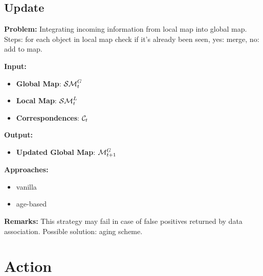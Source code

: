 \documentclass{article}
\begin{document}
		
	
	\subsection{Update} 
	
	{\bf Problem: } Integrating incoming information from local map into global map. Steps: for each object in local map check if it's already been seen, yes: merge, no: add to map. 
	
	\noindent
	{\bf Input: }
	\begin{itemize}
		\item {\bf Global Map}: $\mathcal{SM}_t^G$
		\item {\bf Local Map}: $\mathcal{SM}_t^L$
		\item {\bf Correspondences}: $\mathcal{C}_t$		
	\end{itemize}
	\noindent
	{\bf Output: }
	\begin{itemize}
		\item {\bf Updated Global Map}: $\mathcal{M}_{t+1}^G$
	\end{itemize}
	\noindent
	{\bf Approaches: }
	\begin{itemize}
		\item vanilla
		\item age-based
	\end{itemize}
	\noindent
	{\bf Remarks: } This strategy may fail in case of false positives returned by data association. Possible solution:  aging scheme.
	
		
	\section{Action}
	
\end{document}
